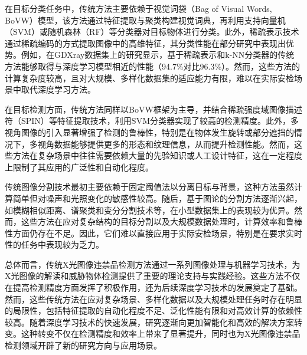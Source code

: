 \documentclass[11pt,twocolumn]{ctexart}
\begin{document}
在目标分类任务中，传统方法主要依赖于视觉词袋（Bag of Visual Words, BoVW）模型，该方法通过特征提取与聚类构建视觉词典，再利用支持向量机（SVM）或随机森林（RF）等分类器对目标物体进行分类\cite{bacstan2011visual,hartigan1979algorithm,breiman2001random,hearst1998support}。此外，稀疏表示技术通过稀疏编码的方式提取图像中的高维特征，其分类性能在部分研究中表现出优势\cite{kundegorski2016using,mery2016object,zhang2014joint,jaccard2014automated,zhang2015study}。例如，在GDXray数据集上的研究显示，基于稀疏表示和k-NN分类器的传统方法能够取得与深度学习模型相近的性能（94.7\%对比96.3\%）\cite{mery2013detection}。然而，这些方法的计算复杂度较高，且对大规模、多样化数据集的适应能力有限，难以在实际安检场景中取代深度学习方法。

在目标检测方面，传统方法同样以BoVW框架为主导\cite{bacstan2015multi,bastan2013object,schmidt2012visual}，并结合稀疏强度域图像描述符（SPIN）\cite{lazebnik2005sparse}等特征提取技术，利用SVM分类器实现了较高的检测精度。此外，多视角图像的引入显著增强了检测的鲁棒性，特别是在物体发生旋转或部分遮挡的情况下，多视角数据能够提供更多的形态和纹理信息，从而提升检测性能\cite{franzel2012object,bacstan2015multi,stefan2007human,von2010multi}。然而，这些方法在复杂场景中往往需要依赖大量的先验知识或人工设计特征，这在一定程度上限制了其应用的广泛性和自动化程度。

传统图像分割技术最初主要依赖于固定阈值法以分离目标与背景\cite{paranjape1998segmentation,sluser1999model}，这种方法虽然计算简单但对噪声和光照变化的敏感性较高。随后，基于图论的分割方法逐渐兴起，如模糊相似距离、谱聚类和变分分割技术等\cite{ding2006x,wang2005structural,mallia2019graph}，在小型数据集上的表现较为优异。然而，这些方法在应对复杂结构的目标分割以及大规模数据处理时，计算效率和鲁棒性方面仍存在不足。因此，它们难以直接应用于实际安检场景，特别是在要求实时性的任务中表现较为乏力。

总体而言，传统X光图像违禁品检测方法通过一系列图像处理与机器学习技术，为X光图像的解读和威胁物体检测提供了重要的理论支持与实践经验。这些方法不仅在提高检测精度方面发挥了积极作用，还为后续深度学习技术的发展奠定了基础。然而，这些传统方法在应对复杂场景、多样化数据以及大规模处理任务时存在明显的局限性，包括特征提取的自动化程度不足、泛化性能有限和对高效计算的依赖性较高。随着深度学习技术的快速发展，研究逐渐向更加智能化和高效的解决方案转变。这种转变不仅在检测精度和效率上带来了显著提升，同时也为X光图像违禁品检测领域开辟了新的研究方向与应用场景。
\end{document}
